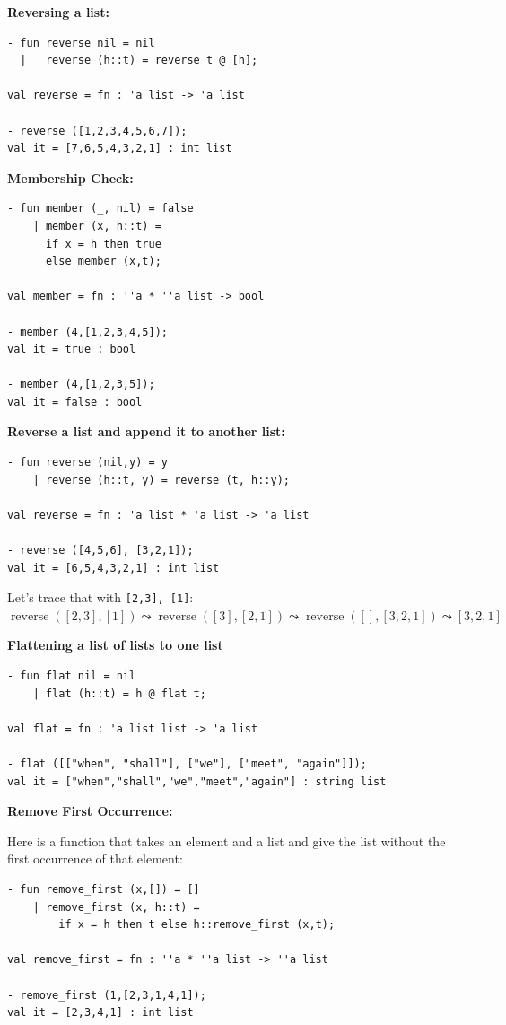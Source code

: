 \textbf{Reversing a list:}
\begin{verbatim}
- fun reverse nil = nil
  |   reverse (h::t) = reverse t @ [h];

val reverse = fn : 'a list -> 'a list

- reverse ([1,2,3,4,5,6,7]);
val it = [7,6,5,4,3,2,1] : int list
\end{verbatim}

\textbf{Membership Check:}
\begin{verbatim}
- fun member (_, nil) = false
    | member (x, h::t) =
      if x = h then true
      else member (x,t);

val member = fn : ''a * ''a list -> bool

- member (4,[1,2,3,4,5]);
val it = true : bool

- member (4,[1,2,3,5]);
val it = false : bool
\end{verbatim}

\textbf{Reverse a list and append it to another list:}
\begin{verbatim}
- fun reverse (nil,y) = y
    | reverse (h::t, y) = reverse (t, h::y);

val reverse = fn : 'a list * 'a list -> 'a list

- reverse ([4,5,6], [3,2,1]);
val it = [6,5,4,3,2,1] : int list
\end{verbatim}
Let's trace that with \texttt{[2,3], [1]}:
$\operatorname{reverse}([2,3],[1]) \leadsto \operatorname{reverse}([3],[2, 1]) \leadsto \operatorname{reverse}([],[3,2,1]) \leadsto [3,2,1]$

\textbf{Flattening a list of lists to one list}
\begin{verbatim}
- fun flat nil = nil
    | flat (h::t) = h @ flat t;

val flat = fn : 'a list list -> 'a list

- flat ([["when", "shall"], ["we"], ["meet", "again"]]);
val it = ["when","shall","we","meet","again"] : string list
\end{verbatim}

\textbf{Remove First Occurrence:}

Here is a function that takes an element and a list and give the list without the first occurrence of that element:
\begin{verbatim}
- fun remove_first (x,[]) = []
    | remove_first (x, h::t) =
        if x = h then t else h::remove_first (x,t);

val remove_first = fn : ''a * ''a list -> ''a list

- remove_first (1,[2,3,1,4,1]);
val it = [2,3,4,1] : int list
\end{verbatim}

